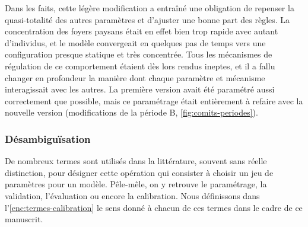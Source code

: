 \documentclass[12pt, a4paper, oneside]{book}
\begin{document}
	Dans les faits, cette légère modification a entraîné une obligation de repenser la quasi-totalité des autres paramètres et d'ajuster une bonne part des règles. 
	La concentration des foyers paysans était en effet bien trop rapide avec autant d'individus, et le modèle convergeait en quelques pas de temps vers une configuration presque statique et très concentrée.
	Tous les mécanismes de régulation de ce comportement étaient dès lors rendus ineptes, et il a fallu changer en profondeur la manière dont chaque paramètre et mécanisme interagissait avec les autres.
	La première version avait été paramétré aussi correctement que possible, mais ce paramétrage était entièrement à refaire avec la nouvelle version (modifications de la période B, \cref{fig:comits-periodes}).
	
	
	\subsubsection{Désambiguïsation}
	
	De nombreux termes sont utilisés dans la littérature, souvent sans réelle distinction, pour désigner cette opération qui consister à choisir un jeu de paramètres pour un modèle. Pêle-mêle, on y retrouve le paramétrage, la validation, l'évaluation ou encore la calibration. Nous définissons dans l'\cref{enc:termes-calibration} le sens donné à chacun de ces termes dans le cadre de ce manuscrit.
	\bigskip
	
\end{document}
